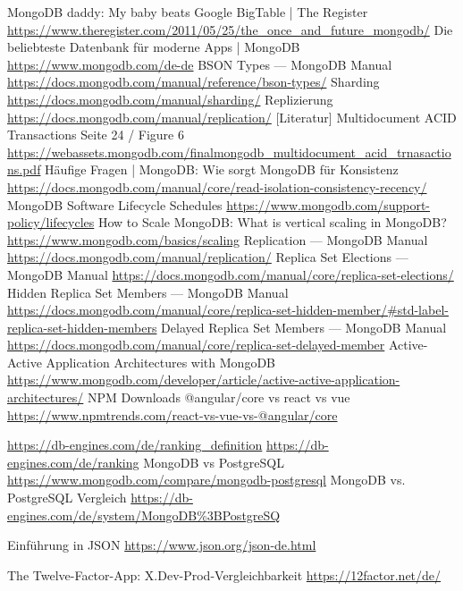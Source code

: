 \begin{thebibliography}{HR08}
   MongoDB daddy: My baby beats Google BigTable | The Register \url{https://www.theregister.com/2011/05/25/the_once_and_future_mongodb/}
   Die beliebteste Datenbank für moderne Apps | MongoDB \url{https://www.mongodb.com/de-de}
   BSON Types — MongoDB Manual \url{https://docs.mongodb.com/manual/reference/bson-types/}
   Sharding \url{https://docs.mongodb.com/manual/sharding/}
   Replizierung \url{https://docs.mongodb.com/manual/replication/}
   [Literatur] Multidocument ACID Transactions Seite 24 / Figure 6 \url{https://webassets.mongodb.com/finalmongodb_multidocument_acid_trnasactions.pdf}
   Häufige Fragen | MongoDB: Wie sorgt MongoDB für Konsistenz \url{https://docs.mongodb.com/manual/core/read-isolation-consistency-recency/}
   MongoDB Software Lifecycle Schedules \url{https://www.mongodb.com/support-policy/lifecycles}
   How to Scale MongoDB: What is vertical scaling in MongoDB? \url{https://www.mongodb.com/basics/scaling}
   Replication — MongoDB Manual \url{https://docs.mongodb.com/manual/replication/}
   Replica Set Elections — MongoDB Manual \url{https://docs.mongodb.com/manual/core/replica-set-elections/}
   Hidden Replica Set Members — MongoDB Manual \url{https://docs.mongodb.com/manual/core/replica-set-hidden-member/#std-label-replica-set-hidden-members}
   Delayed Replica Set Members — MongoDB Manual \url{https://docs.mongodb.com/manual/core/replica-set-delayed-member}
   Active-Active Application Architectures with MongoDB \url{https://www.mongodb.com/developer/article/active-active-application-architectures/}
   NPM Downloads @angular/core vs react vs vue  \url{https://www.npmtrends.com/react-vs-vue-vs-@angular/core}

   \url{https://db-engines.com/de/ranking_definition}
   \url{https://db-engines.com/de/ranking}
   MongoDB vs PostgreSQL \url{https://www.mongodb.com/compare/mongodb-postgresql}
   MongoDB vs. PostgreSQL Vergleich \url{https://db-engines.com/de/system/MongoDB%3BPostgreSQ}

   Einführung in JSON \url{https://www.json.org/json-de.html}

  The Twelve-Factor-App: X.Dev-Prod-Vergleichbarkeit \url{https://12factor.net/de/}







\end{thebibliography}